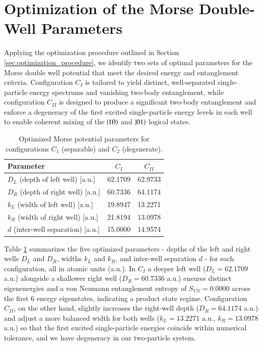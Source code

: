 \documentclass{subfiles}
\begin{document}
\section{Optimization of the Morse Double-Well Parameters}\label{sec:optimization_result}
Applying the optimization procedure outlined in Section \ref{sec:optimization_procedure}, we identify two sets of optimal parameters for the Morse double well potential that meet the desired energy and entanglement criteria. Configuration $C_I$ is tailored to yield distinct, well-separated single-particle energy spectrums and vanishing two-body entanglement, while configuration $C_{II}$ is designed to produce a significant two-body entanglement and enforce a degeneracy of the first excited single-particle energy levels in each well to enable coherent mixing of the $\ket{10}$ and $\ket{01}$ logical states.
\\ 
\begin{table}[h!]
  \centering
  \caption{Optimized Morse potential parameters for configurations \(C_1\) (separable) and \(C_2\) (degenerate).}
  \label{tab:optimized_params}
  \begin{tabular}{lcc}
    \toprule
    Parameter & $C_{I}$ & $C_{II}$ \\
    \midrule
    \(D_L\) (depth of left well)       [a.u.] & 62.1709 & 62.9733 \\
    \(D_R\) (depth of right well)      [a.u.] & 60.7336 & 64.1174 \\
    \(k_L\) (width of left well)       [a.u.] & 19.8947 & 13.2271 \\
    \(k_R\) (width of right well)      [a.u.] & 21.8194 & 13.0978 \\
    \(d\)   (inter-well separation)     [a.u.] & 15.0000 & 14.9574 \\
    \bottomrule
  \end{tabular}
\end{table}

Table \ref{tab:optimized_params} summarizes the five optimized parameters - depths of the left and right wells $D_L$ and $D_R$, widths $k_L$ and $k_R$, and inter-well separation $d$ -  for each configuration, all in atomic units (a.u.). In $C_I$ a deeper left well ($D_L = 62.1709$ a.u.) alongside a shallower right well ($D_R = 60.7336$ a.u.) ensures distinct eigenenergies and a von Neumann entanglement entropy of $S_{VN} = 0.0000$ across the first 6 energy eigenstates, indicating a product state regime. Configuration $C_{II}$, on the other hand, slightly increases the right-well depth ($D_R = 64.1174$ a.u.) and adjust a more balanced width for both wells ($k_L = 13.2271$ a.u., $k_R = 13.0978$ a.u.) so that the first excited single-particle energies coincide within numerical tolerance, and we have degeneracy in our two-particle system.
\end{document}
